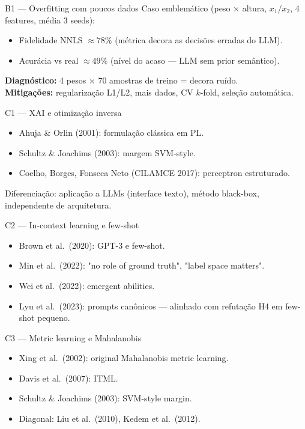 \documentclass[aspectratio=169,10pt]{beamer}
\begin{document}
\begin{frame}{B1 --- Overfitting com poucos dados}
  \footnotesize
  Caso emblem\'atico (peso $\times$ altura, $x_1/x_2$, 4 features, m\'edia 3 seeds):
  \begin{itemize}
    \item Fidelidade NNLS $\approx 78\%$ (m\'etrica decora as decis\~oes erradas do LLM).
    \item Acur\'acia vs real $\approx 49\%$ (n\'ivel do acaso --- LLM sem prior sem\^antico).
  \end{itemize}
  \textbf{Diagn\'ostico:} 4 pesos $\times$ 70 amostras de treino = decora ru\'ido.\\
  \textbf{Mitiga\c{c}\~oes:} regulariza\c{c}\~ao L1/L2, mais dados, CV $k$-fold, sele\c{c}\~ao autom\'atica.
\end{frame}

\begin{frame}{C1 --- XAI e otimiza\c{c}\~ao inversa}
  \footnotesize
  \begin{itemize}
    \item Ahuja \& Orlin (2001): formula\c{c}\~ao cl\'assica em PL.
    \item Schultz \& Joachims (2003): margem SVM-style.
    \item Coelho, Borges, Fonseca Neto (CILAMCE 2017): perceptron estruturado.
  \end{itemize}
  Diferencia\c{c}\~ao: aplica\c{c}\~ao a LLMs (interface texto), m\'etodo black-box, independente de arquitetura.
\end{frame}

\begin{frame}{C2 --- In-context learning e few-shot}
  \footnotesize
  \begin{itemize}
    \item Brown et al.\ (2020): GPT-3 e few-shot.
    \item Min et al.\ (2022): "no role of ground truth", "label space matters".
    \item Wei et al.\ (2022): emergent abilities.
    \item Lyu et al.\ (2023): prompts can\^onicos --- alinhado com refuta\c{c}\~ao H4 em few-shot pequeno.
  \end{itemize}
\end{frame}

\begin{frame}{C3 --- Metric learning e Mahalanobis}
  \footnotesize
  \begin{itemize}
    \item Xing et al.\ (2002): original Mahalanobis metric learning.
    \item Davis et al.\ (2007): ITML.
    \item Schultz \& Joachims (2003): SVM-style margin.
    \item Diagonal: Liu et al.\ (2010), Kedem et al.\ (2012).
  \end{itemize}
\end{frame}
\end{document}
